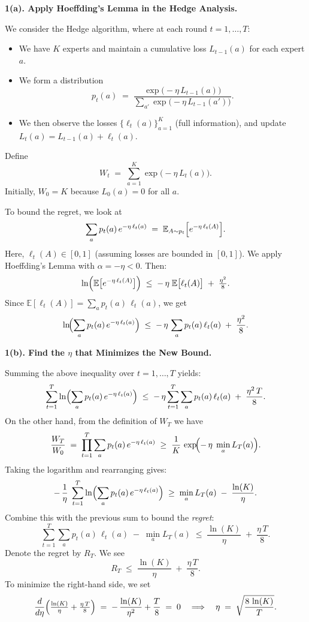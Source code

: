 \textbf{1(a). Apply Hoeffding's Lemma in the Hedge Analysis.}

\smallskip

We consider the Hedge algorithm, where at each round $t=1,\dots,T$:

\begin{itemize}
\item We have $K$ experts and maintain a cumulative loss $L_{t-1}(a)$ for each expert $a$.
\item We form a distribution 
\[
p_t(a) \;=\; \frac{\exp\bigl(-\eta\,L_{t-1}(a)\bigr)}{\sum_{a'} \exp\bigl(-\eta\,L_{t-1}(a')\bigr)}.
\]
\item We then observe the losses $\{\ell_t(a)\}_{a=1}^K$ (full information), and update $L_t(a) = L_{t-1}(a) + \ell_t(a)$.
\end{itemize}

Define
\[
W_t \;=\; \sum_{a=1}^K \exp\bigl(-\eta\,L_t(a)\bigr).
\]
Initially, $W_0 = K$ because $L_0(a) = 0$ for all $a$. 

To bound the regret, we look at 
\[
\sum_{a} p_t(a)\, e^{-\eta\,\ell_t(a)}
\;=\;
\mathbb{E}_{A \sim p_t}\Bigl[e^{-\eta\,\ell_t(A)}\Bigr].
\]
Here, $\ell_t(A)\in[0,1]$ (assuming losses are bounded in $[0,1]$). We apply Hoeffding's Lemma with $\alpha = -\eta < 0$. Then:
\[
\ln\Bigl(\mathbb{E}\bigl[e^{-\eta\,\ell_t(A)}\bigr]\Bigr)
\;\le\;
-\,\eta\;\mathbb{E}\bigl[\ell_t(A)\bigr]
\;+\;
\tfrac{\eta^2}{8}.
\]
Since $\mathbb{E}[\ell_t(A)] = \sum_{a} p_t(a)\,\ell_t(a)$, we get
\[
\ln\!\Bigl(\sum_{a} p_t(a)\, e^{-\eta\,\ell_t(a)}\Bigr)
\;\le\;
-\,\eta\,\sum_{a} p_t(a)\,\ell_t(a) \;+\; \frac{\eta^2}{8}.
\]

\bigskip

\noindent
\textbf{1(b). Find the $\eta$ that Minimizes the New Bound.}

\smallskip

Summing the above inequality over $t=1,\dots,T$ yields:
\[
\sum_{t=1}^T
\ln\Bigl(\sum_{a} p_t(a)\, e^{-\eta\,\ell_t(a)}\Bigr)
\;\le\;
-\,\eta \sum_{t=1}^T \sum_{a} p_t(a)\,\ell_t(a)
\;+\;
\frac{\eta^2\,T}{8}.
\]
On the other hand, from the definition of $W_T$ we have
\[
\frac{W_T}{W_0}
\;=\;
\prod_{t=1}^T \sum_{a} p_t(a)\, e^{-\eta\,\ell_t(a)}
\;\ge\;
\frac{1}{K}\,\exp\!\Bigl(-\,\eta\;\min_{a} L_T(a)\Bigr).
\]
Taking the logarithm and rearranging gives:
\[
-\,\frac{1}{\eta}\;
\sum_{t=1}^T
\ln\Bigl(\sum_{a} p_t(a)\, e^{-\eta\,\ell_t(a)}\Bigr)
\;\ge\;
\min_{a} L_T(a)
\;-\;
\frac{\ln(K)}{\eta}.
\]
Combine this with the previous sum to bound the \emph{regret}:
\[
\sum_{t=1}^T \sum_{a} p_t(a)\,\ell_t(a) \;-\; \min_{a} L_T(a)
\;\le\;
\frac{\ln(K)}{\eta} \;+\; \frac{\eta\,T}{8}.
\]
Denote the regret by $R_T$. We see
\[
R_T 
\;\le\;
\frac{\ln(K)}{\eta}
\;+\;
\frac{\eta\,T}{8}.
\]
To minimize the right-hand side, we set
\[
\frac{d}{d\eta}\Bigl(\tfrac{\ln(K)}{\eta} + \tfrac{\eta\,T}{8}\Bigr)
\;=\;
-\,\frac{\ln(K)}{\eta^2} + \frac{T}{8}
\;=\;0
\quad\Longrightarrow\quad
\eta
\;=\;
\sqrt{\frac{8\,\ln(K)}{T}}.
\]

